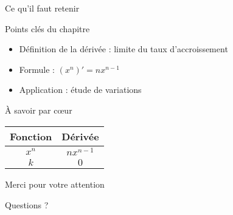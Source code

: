 \documentclass[12pt, xcolor={svgnames}]{beamer}
\theoremstyle{definition}
\begin{document}
\begin{frame}{Ce qu'il faut retenir}
  \begin{block}{Points clés du chapitre}
    \begin{itemize}
      \item Définition de la dérivée : limite du taux d'accroissement
      \item Formule : $(x^n)' = nx^{n-1}$
      \item Application : étude de variations
    \end{itemize}
  \end{block}

  \pause

  \begin{alertblock}{À savoir par cœur}
    \begin{center}
      \begin{tabular}{c|c}
        Fonction & Dérivée \\
        \hline
        $x^n$ & $nx^{n-1}$ \\
        $k$ & $0$ \\
      \end{tabular}
    \end{center}
  \end{alertblock}
\end{frame}

\begin{frame}
  \begin{center}
    {\Large Merci pour votre attention}

    \vspace{2em}

    {\normalsize Questions ?}
  \end{center}
\end{frame}
\end{document}
